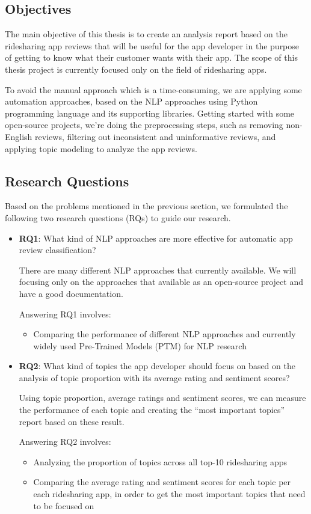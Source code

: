 \documentclass[12pt]{article}
\begin{document}
\subsection{Objectives}
The main objective of this thesis is to create an analysis report based on the ridesharing app reviews that will be useful for the app developer in the purpose of getting to know what their customer wants with their app. The scope of this thesis project is currently focused only on the field of ridesharing apps.

To avoid the manual approach which is a time-consuming, we are applying some automation approaches, based on the NLP approaches using Python programming language and its supporting libraries. Getting started with some open-source projects, we’re doing the preprocessing steps, such as removing non-English reviews, filtering out inconsistent and uninformative reviews, and applying topic modeling to analyze the app reviews.

\newpage
\subsection{Research Questions}
Based on the problems mentioned in the previous section, we formulated the following two research questions (RQs) to guide our research.
\begin{itemize}
\item \textbf{RQ1}: What kind of NLP approaches are more effective for automatic app review classification?

There are many different NLP approaches that currently available. We will focusing only on the approaches that available as an open-source project and have a good documentation.

Answering RQ1 involves: 
\begin{itemize}
\item Comparing the performance of different NLP approaches and currently widely used Pre-Trained Models (PTM) for NLP research
\end{itemize}

\item \textbf{RQ2}: What kind of topics the app developer should focus on based on the analysis of topic proportion with its average rating and sentiment scores?

Using topic proportion, average ratings and sentiment scores, we can measure the performance of each topic and creating the “most important topics” report based on these result.

Answering RQ2 involves:
\begin{itemize}
\item Analyzing the proportion of topics across all top-10 ridesharing apps
\item Comparing the average rating and sentiment scores for each topic per each ridesharing app, in order to get the most important topics that need to be focused on
\end{itemize}
\end{itemize}
\end{document}
